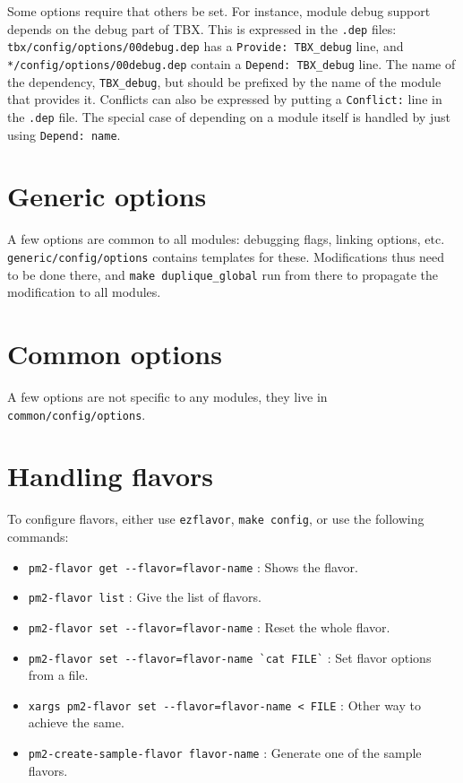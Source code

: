 \documentclass[11pt, a4paper ,twoside]{article}
\begin{document}
Some options require that others be set.  For instance, module debug
support depends on the debug part of TBX.  This is expressed in
the \verb+.dep+ files: \verb+tbx/config/options/00debug.dep+ has a
\verb+Provide: TBX_debug+ line, and \verb+*/config/options/00debug.dep+
contain a \verb+Depend: TBX_debug+ line. The name of the dependency,
\verb+TBX_debug+, but should be prefixed by the name of the module that
provides it. Conflicts can also be expressed by putting a
\verb+Conflict:+ line in the \verb+.dep+ file. The special case of
depending on a module itself is handled by just using
\verb+Depend: name+.

\section{Generic options}

A few options are common to all modules: debugging flags, linking
options, etc. \verb+generic/config/options+ contains templates for
these.  Modifications thus need to be done there, and
\verb+make duplique_global+ run from there to propagate the modification
to all modules.

\section{Common options}

A few options are not specific to any modules, they live in
\verb+common/config/options+.

\section{Handling flavors}

To configure flavors, either use \verb+ezflavor+, \verb+make config+, or
use the following commands:
\begin{itemize}
\item \verb|pm2-flavor get --flavor=flavor-name| : Shows the
flavor.
\item \verb|pm2-flavor list| : Give the list of flavors.
\item \verb|pm2-flavor set --flavor=flavor-name| : Reset the whole
flavor.
\item \verb|pm2-flavor set --flavor=flavor-name `cat FILE`| : Set
flavor options from a file.
\item \verb|xargs pm2-flavor set --flavor=flavor-name < FILE| : Other
way to achieve the same.
\item \verb|pm2-create-sample-flavor flavor-name| : Generate one of the
sample flavors.
\end{itemize}
\end{document}
